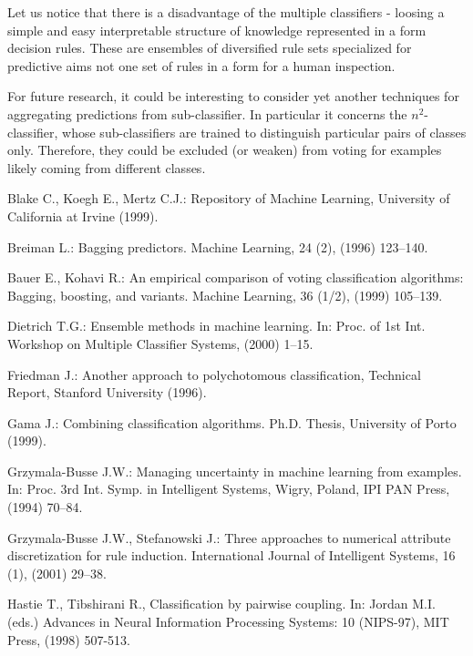 \documentclass{llncs}
\begin{document}
Let us notice that there is a disadvantage of the multiple classifiers -
loosing a simple and easy interpretable structure of knowledge represented
in a form decision rules. These are  ensembles of diversified rule sets
specialized for predictive aims not one set of rules in a  form for a human
inspection.

For future research, it could be interesting to consider yet another
 techniques for aggregating predictions from sub-classifier. In particular
 it concerns the $n^2$-classifier, whose  sub-classifiers are trained to
 distinguish particular pairs of classes only. Therefore, they could be
 excluded (or weaken) from voting for examples likely coming from different
 classes.

\begin{thebibliography}{17}


  Blake C., Koegh E., Mertz C.J.: Repository of Machine Learning,
University of California at Irvine (1999).

  Breiman L.:  Bagging predictors. Machine Learning,
24 (2), (1996) 123--140.

 Bauer E., Kohavi R.:  An empirical comparison of voting classification
algorithms: Bagging, boosting, and variants. Machine Learning, 36 (1/2),
(1999) 105--139.

 Dietrich T.G.: Ensemble methods in machine learning.
In: Proc. of 1st Int. Workshop on Multiple Classifier Systems, (2000) 1--15.

  Friedman J.: Another approach to polychotomous
classification, Technical Report, Stanford University (1996).


  Gama J.: Combining classification algorithms. Ph.D. Thesis,
University of Porto (1999).


 Grzymala-Busse J.W.: Managing uncertainty in machine
learning from examples. In: Proc. 3rd Int. Symp. in Intelligent Systems,
Wigry, Poland, IPI PAN Press, (1994) 70--84.

 Grzymala-Busse J.W., Stefanowski J.:
Three approaches to numerical attribute discretization for rule induction.
International Journal of Intelligent Systems, 16 (1), (2001) 29--38.

  Hastie T., Tibshirani R., Classification by pairwise
coupling. In: Jordan M.I. (eds.) Advances in Neural Information Processing
Systems: 10 (NIPS-97), MIT Press, (1998) 507-513.


\end{thebibliography}
\end{document}
